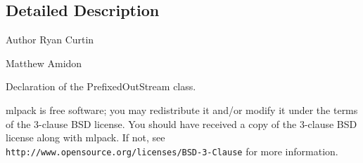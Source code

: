 \subsection{Detailed Description}
\begin{DoxyAuthor}{Author}
Ryan Curtin 

Matthew Amidon
\end{DoxyAuthor}
Declaration of the Prefixed\+Out\+Stream class.

mlpack is free software; you may redistribute it and/or modify it under the terms of the 3-\/clause B\+SD license. You should have received a copy of the 3-\/clause B\+SD license along with mlpack. If not, see {\tt http\+://www.\+opensource.\+org/licenses/\+B\+S\+D-\/3-\/\+Clause} for more information. 